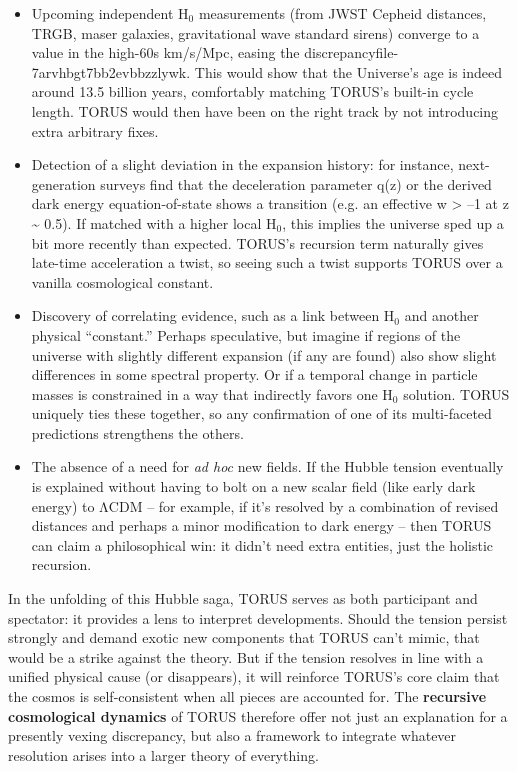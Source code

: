 \documentclass[]{article}
\newcommand{\subscript}[1]{\ensuremath{_{\mathrm{#1}}}}
\begin{document}
\begin{itemize}
\item
  Upcoming independent
  H\subscript{0}
  measurements (from JWST Cepheid distances, TRGB, maser galaxies,
  gravitational wave standard sirens) converge to a value in the
  high-60s km/s/Mpc, easing the discrepancy​file-7arvhbgt7bb2evbbzzlywk.
  This would show that the Universe's age is indeed around 13.5 billion
  years, comfortably matching TORUS's built-in cycle length. TORUS would
  then have been on the right track by not introducing extra arbitrary
  fixes.
\item
  Detection of a slight deviation in the expansion history: for
  instance, next-generation surveys find that the deceleration parameter
  q(z) or the derived dark energy equation-of-state shows a transition
  (e.g. an effective w \textgreater{} --1 at z \textasciitilde{} 0.5).
  If matched with a higher local
  H\subscript{0}, this
  implies the universe sped up a bit more recently than expected.
  TORUS's recursion term naturally gives late-time acceleration a twist,
  so seeing such a twist supports TORUS over a vanilla cosmological
  constant.
\item
  Discovery of correlating evidence, such as a link between
  H\subscript{0} and
  another physical ``constant.'' Perhaps speculative, but imagine if
  regions of the universe with slightly different expansion (if any are
  found) also show slight differences in some spectral property. Or if a
  temporal change in particle masses is constrained in a way that
  indirectly favors one
  H\subscript{0} solution.
  TORUS uniquely ties these together, so any confirmation of one of its
  multi-faceted predictions strengthens the others.
\item
  The absence of a need for \emph{ad hoc} new fields. If the Hubble
  tension eventually is explained without having to bolt on a new scalar
  field (like early dark energy) to ΛCDM -- for example, if it's
  resolved by a combination of revised distances and perhaps a minor
  modification to dark energy -- then TORUS can claim a philosophical
  win: it didn't need extra entities, just the holistic recursion.
\end{itemize}

In the unfolding of this Hubble saga, TORUS serves as both participant
and spectator: it provides a lens to interpret developments. Should the
tension persist strongly and demand exotic new components that TORUS
can't mimic, that would be a strike against the theory. But if the
tension resolves in line with a unified physical cause (or disappears),
it will reinforce TORUS's core claim that the cosmos is self-consistent
when all pieces are accounted for. The \textbf{recursive cosmological
dynamics} of TORUS therefore offer not just an explanation for a
presently vexing discrepancy, but also a framework to integrate whatever
resolution arises into a larger theory of everything.
\end{document}

